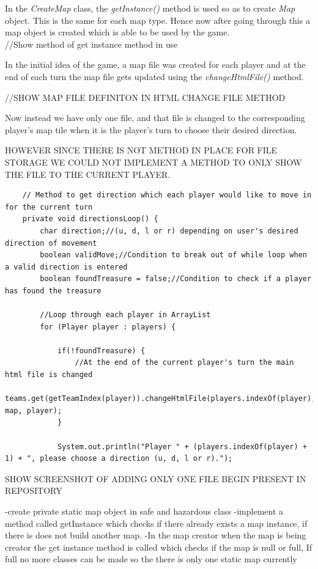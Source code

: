 \documentclass[a4paper,12pt]{extarticle}
\begin{document}
In the \textit{CreateMap} class, the \textit{getInstance()} method is used so as to create \textit{Map} object. This is the same for each map type. Hence now after going through this a map object is created which is able to be used by the game.\\

//Show method of get instance method in use 

In the initial idea of the game, a map file was created for each player and at the end of each turn the map file gets updated using the \textit{changeHtmlFile()} method.

//SHOW MAP FILE DEFINITON IN HTML CHANGE FILE METHOD

Now instead we have only one file, and that file is changed to the corresponding player's map tile when it is the player's turn to choose their desired direction.

HOWEVER SINCE THERE IS NOT METHOD IN PLACE FOR FILE STORAGE WE COULD NOT IMPLEMENT A METHOD TO ONLY SHOW THE FILE TO THE CURRENT PLAYER.

\begin{lstlisting}
    // Method to get direction which each player would like to move in for the current turn
    private void directionsLoop() {
        char direction;//(u, d, l or r) depending on user's desired direction of movement
        boolean validMove;//Condition to break out of while loop when a valid direction is entered
        boolean foundTreasure = false;//Condition to check if a player has found the treasure

        //Loop through each player in ArrayList
        for (Player player : players) {

            if(!foundTreasure) {
                //At the end of the current player's turn the main html file is changed
                teams.get(getTeamIndex(player)).changeHtmlFile(players.indexOf(player), map, player);
            }

            System.out.println("Player " + (players.indexOf(player) + 1) + ", please choose a direction (u, d, l or r).");
\end{lstlisting}


SHOW SCREENSHOT OF ADDING ONLY ONE FILE BEGIN PRESENT IN REPOSITORY


-create private static map object in safe and hazardous class
-implement a method called getInstance which checks if there already exists a map instance, if there is does not build another map.
-In the map creator when the map is being creator the get instance method is called which checks if the map is null or full,
If full no more classes can be made so the there is only one static map currently
\end{document}
